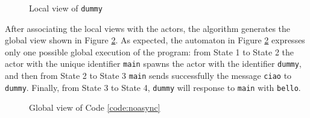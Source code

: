 \begin{exmp}
\begin{figure}[ht!]
{
    }
    \caption{Local view of \texttt{dummy}}
    \label{local:dummy1a}
\end{figure}

After associating the local views with the actors, the algorithm generates the global view shown in Figure \ref{global:noasync}. As expected, the automaton in Figure \ref{global:noasync} expresses only one possible global execution of the program: from State 1 to State 2 the actor with the unique identifier \texttt{main} spawns the actor with the  identifier \texttt{dummy}, and then from State 2 to State 3 \texttt{main} sends successfully the message \texttt{ciao} to \texttt{dummy}. Finally, from State 3 to State 4, \texttt{dummy} will response to \texttt{main} with \texttt{bello}.

\begin{figure}[ht!]
    \centering
    \caption{Global view of Code \ref{code:noasync}}
    \label{global:noasync}
\end{figure}
\end{exmp}
